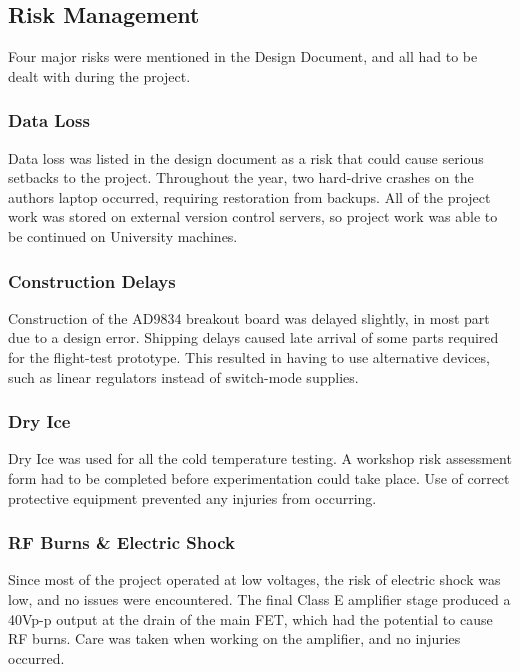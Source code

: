 \documentclass[a4paper,12pt]{article}
\begin{document}
\subsection{Risk Management}
Four major risks were mentioned in the Design Document, and all had to be dealt with during the project.
\subsubsection{Data Loss}
Data loss was listed in the design document as a risk that could cause serious setbacks to the project. Throughout the year, two hard-drive crashes on the authors laptop occurred, requiring restoration from backups. All of the project work was stored on external version control servers, so project work was able to be continued on University machines.

\subsubsection{Construction Delays}
Construction of the AD9834 breakout board was delayed slightly, in most part due to a design error. Shipping delays caused late arrival of some parts required for the flight-test prototype. This resulted in having to use alternative devices, such as linear regulators instead of switch-mode supplies. 

\subsubsection{Dry Ice}
Dry Ice was used for all the cold temperature testing. A workshop risk assessment form had to be completed before experimentation could take place. Use of correct protective equipment prevented any injuries from occurring.

\subsubsection{RF Burns \& Electric Shock}
Since most of the project operated at low voltages, the risk of electric shock was low, and no issues were encountered. The final Class E amplifier stage produced a 40Vp-p output at the drain of the main FET, which had the potential to cause RF burns. Care was taken when working on the amplifier, and no injuries occurred.
\end{document}
